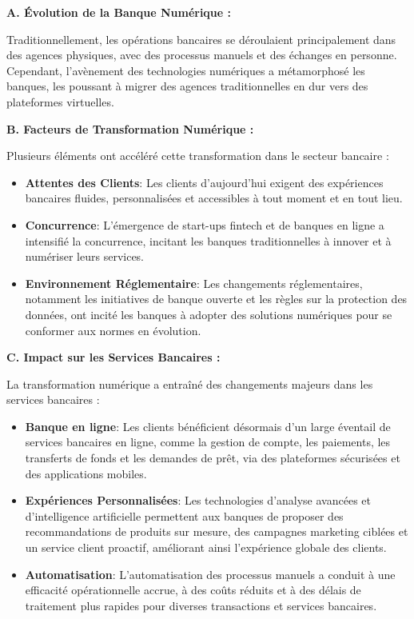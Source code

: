 \textbf{A. Évolution de la Banque Numérique :}

Traditionnellement, les opérations bancaires se déroulaient principalement dans des agences physiques, avec des processus manuels et des échanges en personne. Cependant, l'avènement des technologies numériques a métamorphosé les banques, les poussant à migrer des agences traditionnelles en dur vers des plateformes virtuelles.


\textbf{B. Facteurs de Transformation Numérique :}

Plusieurs éléments ont accéléré cette transformation dans le secteur bancaire :
\begin{itemize}
    \item \textbf{Attentes des Clients}: Les clients d'aujourd'hui exigent des expériences bancaires fluides, personnalisées et accessibles à tout moment et en tout lieu.
    \item \textbf{Concurrence}: L'émergence de start-ups fintech et de banques en ligne a intensifié la concurrence, incitant les banques traditionnelles à innover et à numériser leurs services.
    \item \textbf{Environnement Réglementaire}: Les changements réglementaires, notamment les initiatives de banque ouverte et les règles sur la protection des données, ont incité les banques à adopter des solutions numériques pour se conformer aux normes en évolution.
\end{itemize}


\textbf{C. Impact sur les Services Bancaires :}

La transformation numérique a entraîné des changements majeurs dans les services bancaires :
\begin{itemize}
    \item \textbf{Banque en ligne}: Les clients bénéficient désormais d'un large éventail de services bancaires en ligne, comme la gestion de compte, les paiements, les transferts de fonds et les demandes de prêt, via des plateformes sécurisées et des applications mobiles.
    \item \textbf{Expériences Personnalisées}: Les technologies d'analyse avancées et d'intelligence artificielle permettent aux banques de proposer des recommandations de produits sur mesure, des campagnes marketing ciblées et un service client proactif, améliorant ainsi l'expérience globale des clients.
    \item \textbf{Automatisation}: L'automatisation des processus manuels a conduit à une efficacité opérationnelle accrue, à des coûts réduits et à des délais de traitement plus rapides pour diverses transactions et services bancaires.
\end{itemize}



